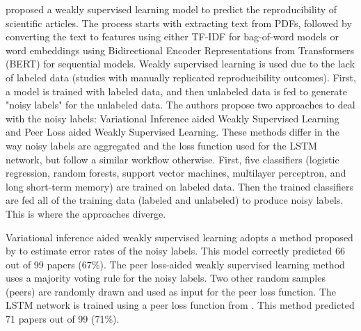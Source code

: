 \documentclass[12pt, a4paper, twocolumn]{article}
\begin{document}
			\citet{luo2020research} proposed a weakly supervised learning model to predict the reproducibility of scientific articles. The process starts with extracting text from PDFs, followed by converting the text to features using either TF-IDF for bag-of-word models or word embeddings using Bidirectional Encoder Representations from Transformers (BERT) for sequential models. Weakly supervised learning is used due to the lack of labeled data (studies with manually replicated reproducibility outcomes). First, a model is trained with labeled data, and then unlabeled data is fed to generate "noisy labels" for the unlabeled data. The authors propose two approaches to deal with the noisy labels: Variational Inference aided Weakly Supervised Learning and Peer Loss aided Weakly Supervised Learning. These methods differ in the way noisy labels are aggregated and the loss function used for the LSTM network, but follow a similar workflow otherwise. First, five classifiers (logistic regression, random forests, support vector machines, multilayer perceptron, and long short-term memory) are trained on labeled data. Then the trained classifiers are fed all of the training data (labeled and unlabeled) to produce noisy labels. This is where the approaches diverge.
			
			Variational inference aided weakly supervised learning adopts a method proposed by \citet{Liu2012VariationalIF} to estimate error rates of the noisy labels. This model correctly predicted 66 out of 99 papers (67\%). The peer loss-aided weakly supervised learning method uses a majority voting rule for the noisy labels. Two other random samples (peers) are randomly drawn and used as input for the peer loss function. The LSTM network is trained using a peer loss function from \citet{liu2020peer}. This method predicted 71 papers out of 99 (71\%).


\end{document}
